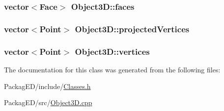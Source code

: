 \subsubsection[{\texorpdfstring{faces}{faces}}]{\setlength{\rightskip}{0pt plus 5cm}vector$<${\bf Face}$>$ Object3\+D\+::faces}\hypertarget{class_object3_d_a58677f390d3ba13026e68f4b2a530580}{}\label{class_object3_d_a58677f390d3ba13026e68f4b2a530580}
\subsubsection[{\texorpdfstring{projected\+Vertices}{projectedVertices}}]{\setlength{\rightskip}{0pt plus 5cm}vector$<${\bf Point}$>$ Object3\+D\+::projected\+Vertices\hspace{0.3cm}{\ttfamily [private]}}\hypertarget{class_object3_d_a40518019f2d67c105a32d218e38a0d4f}{}\label{class_object3_d_a40518019f2d67c105a32d218e38a0d4f}
\subsubsection[{\texorpdfstring{vertices}{vertices}}]{\setlength{\rightskip}{0pt plus 5cm}vector$<${\bf Point}$>$ Object3\+D\+::vertices}\hypertarget{class_object3_d_a225a5c970a1d3d343fc495764ccc3cfd}{}\label{class_object3_d_a225a5c970a1d3d343fc495764ccc3cfd}


The documentation for this class was generated from the following files\+:\begin{DoxyCompactItemize}
\item 
Packag\+E\+D/include/\hyperlink{_classes_8h}{Classes.\+h}\item 
Packag\+E\+D/src/\hyperlink{_object3_d_8cpp}{Object3\+D.\+cpp}\end{DoxyCompactItemize}
